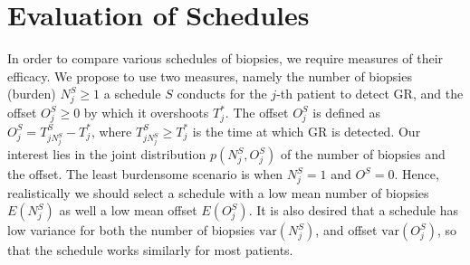 
\section{Evaluation of Schedules}
\label{sec : choosing_schedule}
In order to compare various schedules of biopsies, we require measures of their efficacy. We propose to use two measures, namely the number of biopsies (burden) $N^S_j \geq 1$ a schedule $S$ conducts for the $j$-th patient to detect GR, and the offset $O^S_j \geq 0$ by which it overshoots $T^*_j$. The offset $O^S_j$ is defined as $O^S_j = T^S_{j{N^S_j}} - T^*_j$, where $T^S_{j{N^S_j}} \geq T^*_j$ is the time at which GR is detected. Our interest lies in the joint distribution $p(N^S_j, O^S_j)$ of the number of biopsies and the offset. The least burdensome scenario is when $N^S_j=1$ and $O^S=0$. Hence, realistically we should select a schedule with a low mean number of biopsies $E(N^S_j)$ as well a low mean offset $E(O^S_j)$. It is also desired that a schedule has low variance for both the number of biopsies $\mbox{var}(N^S_j)$, and offset $\mbox{var}(O^S_j)$, so that the schedule works similarly for most patients. 

